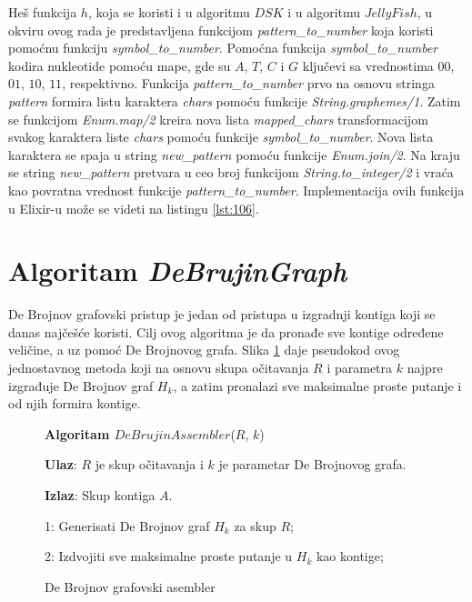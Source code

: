 \documentclass[12pt,oneside]{memoir}
\begin{document}
Heš funkcija $h$, koja se koristi i u algoritmu $DSK$ i u algoritmu $JellyFish$, u okviru ovog rada je predstavljena funkcijom \textit{pattern\_to\_number} koja koristi pomoćnu funkciju \textit{symbol\_to\_number}. Pomoćna funkcija \textit{symbol\_to\_number} kodira nukleotide pomoću mape, gde su $A$, $T$, $C$ i $G$ ključevi sa vrednostima $00$, $01$, $10$, $11$, respektivno. Funkcija \textit{pattern\_to\_number} prvo na osnovu stringa \textit{pattern} formira listu karaktera \textit{chars} pomoću funkcije \textit{String.graphemes/1}. Zatim se funkcijom \textit{Enum.map/2} kreira nova lista \textit{mapped\_chars} transformacijom svakog karaktera liste \textit{chars} pomoću funkcije \textit{symbol\_to\_number}. Nova lista karaktera se spaja u string \textit{new\_pattern} pomoću funkcije \textit{Enum.join/2}. Na kraju se string \textit{new\_pattern} pretvara u ceo broj funkcijom \textit{String.to\_integer/2} i vraća kao povratna vrednost funkcije \textit{pattern\_to\_number}. Implementacija ovih funkcija u Elixir-u može se videti na listingu \ref{lst:106}.



\section{Algoritam \textit{DeBrujinGraph}}
\label{odeljak:ImplementacijaDB}

De Brojnov grafovski pristup je jedan od pristupa u izgradnji kontiga koji se danas najčešće koristi. Cilj ovog algoritma je da pronađe sve kontige određene veličine, a uz pomoć De Brojnovog grafa. Slika \ref{box:DeBrujinAssembler} daje pseudokod ovog jednostavnog metoda koji na osnovu skupa očitavanja $R$ i parametra $k$ najpre izgrađuje De Brojnov graf $H_k$, a zatim pronalazi sve maksimalne proste putanje i od njih formira kontige.

\begin{figure}[!ht]
\begin{tcolorbox}
\textbf{Algoritam $DeBrujinAssembler$}($R$, $k$)

\textbf{Ulaz}: $R$ je skup očitavanja i $k$ je parametar De Brojnovog grafa.

\textbf{Izlaz}: Skup kontiga $A$.

1: Generisati De Brojnov graf $H_k$ za skup $R$;

2: Izdvojiti sve maksimalne proste putanje u $H_k$ kao kontige;

\end{tcolorbox}
\caption{De Brojnov grafovski asembler \cite{WingKinSung}}
\label{box:DeBrujinAssembler}
\end{figure}
\end{document}
